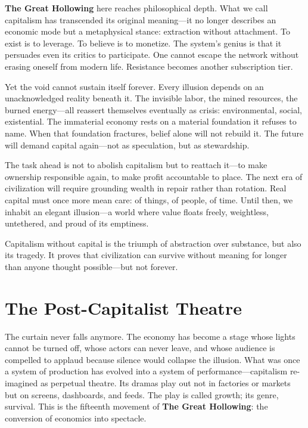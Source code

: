 \documentclass[11pt,twoside]{book}
\begin{document}
\textbf{The Great Hollowing} here reaches philosophical depth.  What we call capitalism has transcended its original meaning—it no longer describes an economic mode but a metaphysical stance: extraction without attachment.  To exist is to leverage.  To believe is to monetize.  The system’s genius is that it persuades even its critics to participate.  One cannot escape the network without erasing oneself from modern life.  Resistance becomes another subscription tier.

Yet the void cannot sustain itself forever.  Every illusion depends on an unacknowledged reality beneath it.  The invisible labor, the mined resources, the burned energy—all reassert themselves eventually as crisis: environmental, social, existential.  The immaterial economy rests on a material foundation it refuses to name.  When that foundation fractures, belief alone will not rebuild it.  The future will demand capital again—not as speculation, but as stewardship.

The task ahead is not to abolish capitalism but to reattach it—to make ownership responsible again, to make profit accountable to place.  The next era of civilization will require grounding wealth in repair rather than rotation.  Real capital must once more mean care: of things, of people, of time.  Until then, we inhabit an elegant illusion—a world where value floats freely, weightless, untethered, and proud of its emptiness.

Capitalism without capital is the triumph of abstraction over substance, but also its tragedy.  It proves that civilization can survive without meaning for longer than anyone thought possible—but not forever.

\chapter{The Post-Capitalist Theatre}
\label{ch:15}

The curtain never falls anymore.  
The economy has become a stage whose lights cannot be turned off, whose actors can never leave, and whose audience is compelled to applaud because silence would collapse the illusion.  What was once a system of production has evolved into a system of performance—capitalism re-imagined as perpetual theatre.  Its dramas play out not in factories or markets but on screens, dashboards, and feeds.  The play is called growth; its genre, survival.  This is the fifteenth movement of \textbf{The Great Hollowing}: the conversion of economics into spectacle.
\end{document}
